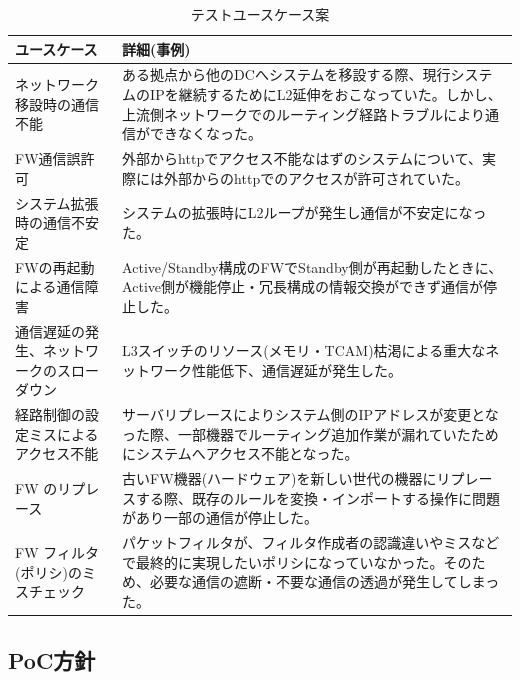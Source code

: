 \begin{table}[hb]
 \centering
 \caption{テストユースケース案}
 \label{tab:test-usecases}
 \begin{tabularx}{\linewidth}{p{10em}|X}
  \hline
  ユースケース & 詳細(事例) \\
  \hline
  \hline
  ネットワーク移設時の通信不能 & ある拠点から他のDCへシステムを移設する際、現行システムのIPを継続するためにL2延伸をおこなっていた。しかし、上流側ネットワークでのルーティング経路トラブルにより通信ができなくなった。 \\ \hline
  FW通信誤許可 & 外部からhttpでアクセス不能なはずのシステムについて、実際には外部からのhttpでのアクセスが許可されていた。 \\ \hline
  システム拡張時の通信不安定 & システムの拡張時にL2ループが発生し通信が不安定になった。 \\ \hline
  FWの再起動による通信障害 & Active/Standby構成のFWでStandby側が再起動したときに、Active側が機能停止・冗長構成の情報交換ができず通信が停止した。\\ \hline
  通信遅延の発生、ネットワークのスローダウン & L3スイッチのリソース(メモリ・TCAM)枯渇による重大なネットワーク性能低下、通信遅延が発生した。 \\ \hline
  経路制御の設定ミスによるアクセス不能 & サーバリプレースによりシステム側のIPアドレスが変更となった際、一部機器でルーティング追加作業が漏れていたためにシステムへアクセス不能となった。 \\ \hline
  FW のリプレース & 古いFW機器(ハードウェア)を新しい世代の機器にリプレースする際、既存のルールを変換・インポートする操作に問題があり一部の通信が停止した。 \\ \hline
  FW フィルタ(ポリシ)のミスチェック & パケットフィルタが、フィルタ作成者の認識違いやミスなどで最終的に実現したいポリシになっていなかった。そのため、必要な通信の遮断・不要な通信の透過が発生してしまった。 \\
  \hline
 \end{tabularx}
\end{table}

  \subsection{PoC方針}

